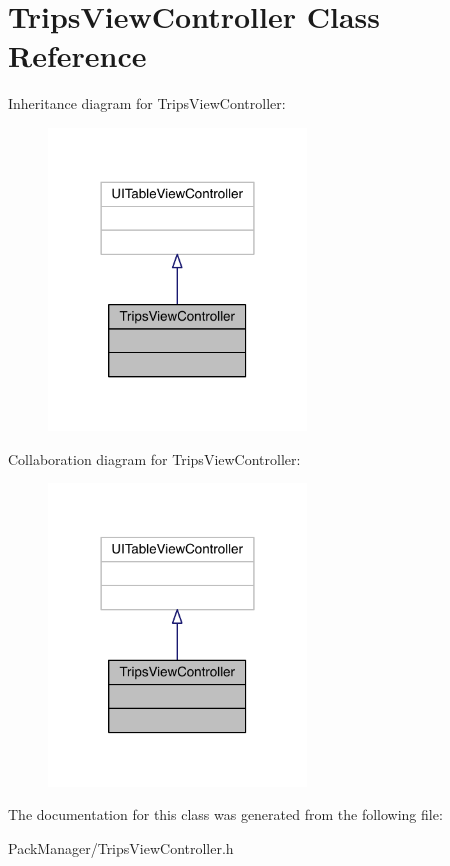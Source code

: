 \hypertarget{interface_trips_view_controller}{\section{Trips\-View\-Controller Class Reference}
\label{interface_trips_view_controller}
}


Inheritance diagram for Trips\-View\-Controller\-:\nopagebreak
\begin{figure}[H]
\begin{center}
\leavevmode
\includegraphics[width=194pt]{interface_trips_view_controller__inherit__graph}
\end{center}
\end{figure}


Collaboration diagram for Trips\-View\-Controller\-:\nopagebreak
\begin{figure}[H]
\begin{center}
\leavevmode
\includegraphics[width=194pt]{interface_trips_view_controller__coll__graph}
\end{center}
\end{figure}


The documentation for this class was generated from the following file\-:\begin{DoxyCompactItemize}
\item 
Pack\-Manager/Trips\-View\-Controller.\-h\end{DoxyCompactItemize}

